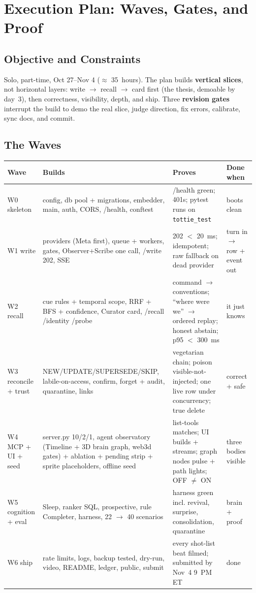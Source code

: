 \chapter{Execution Plan: Waves, Gates, and Proof}

\section{Objective and Constraints}
Solo, part-time, Oct 27--Nov 4 ($\approx$ 35~hours). The plan builds \textbf{vertical slices},
not horizontal layers: write $\rightarrow$ recall $\rightarrow$ card first (the thesis, demoable
by day~3), then correctness, visibility, depth, and ship. Three \textbf{revision gates} interrupt
the build to demo the real slice, judge direction, fix errors, calibrate, sync docs, and commit.

\section{The Waves}
\begin{longtable}{@{}p{}p{}p{}p{}@{}}
\toprule
Wave & Builds & Proves & Done when \\
\midrule
W0 skeleton & config, db pool + migrations, embedder, main, auth, CORS, /health, conftest & /health green; 401s; pytest runs on \texttt{tottie\_test} & boots clean \\
W1 write & providers (Meta first), queue + workers, gates, Observer+Scribe one call, /write 202, SSE & 202 $<$ 20~ms; idempotent; raw fallback on dead provider & turn in $\rightarrow$ row + event out \\
W2 recall & cue rules + temporal scope, RRF + BFS + confidence, Curator card, /recall /identity /probe & command $\rightarrow$ conventions; ``where were we'' $\rightarrow$ ordered replay; honest abstain; p95 $<$ 300~ms & it just knows \\
W3 reconcile + trust & NEW/UPDATE/SUPERSEDE/SKIP, labile-on-access, confirm, forget + audit, quarantine, links & vegetarian chain; poison visible-not-injected; one live row under concurrency; true delete & correct + safe \\
W4 MCP + UI + seed & server.py 10/2/1, agent observatory (Timeline + 3D brain graph, web3d gates) + ablation + pending strip + sprite placeholders, offline seed & list-tools matches; UI builds + streams; graph nodes pulse + path lights; OFF $\neq$ ON & three bodies visible \\
W5 cognition + eval & Sleep, ranker SQL, prospective, rule Completer, harness, 22 $\rightarrow$ 40 scenarios & harness green incl. revival, surprise, consolidation, quarantine & brain + proof \\
W6 ship & rate limits, logs, backup tested, dry-run, video, README, ledger, public, submit & every shot-list beat filmed; submitted by Nov~4 9~PM ET & done \\
\bottomrule
\end{longtable}


